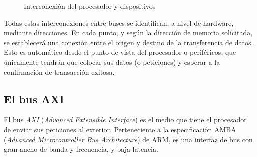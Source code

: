 \documentclass[../main.tex]{subfiles}
\begin{document}
\begin{figure}
        \caption{Interconexión del procesador y dispositivos}
        \label{fig:processor_interconnect}
    \end{figure}

    Todas estas interconexiones entre buses se identifican, a nivel de hardware, mediante direcciones. En cada punto, y según la dirección de memoria solicitada, se establecerá una conexión entre el origen y destino de la transferencia de datos. Esto es automático desde el punto de vista del procesador o periféricos, que únicamente tendrán que colocar sus datos (o peticiones) y esperar a la confirmación de transacción exitosa.

    \subsection{El bus AXI}
            El bus \emph{AXI} (\emph{Advanced Extensible Interface}) es el medio que tiene el procesador de enviar sus peticiones al exterior. Perteneciente a la especificación AMBA (\emph{Advanced Microcontroller Bus Architecture}) de ARM, es una interfaz de bus con gran ancho de banda y frecuencia, y baja latencia.
\end{document}
